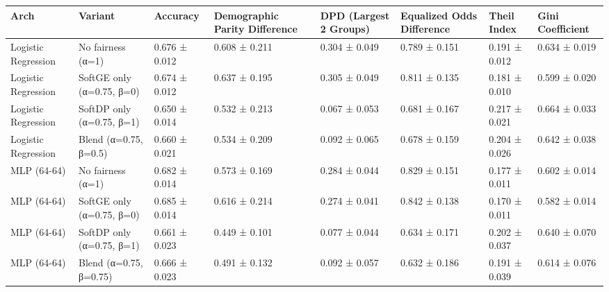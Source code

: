 \begin{tabular}{llllllll}
\toprule
Arch & Variant & Accuracy & Demographic Parity Difference & DPD (Largest 2 Groups) & Equalized Odds Difference & Theil Index & Gini Coefficient \\
\midrule
Logistic Regression & No fairness (α=1) & 0.676 ± 0.012 & 0.608 ± 0.211 & 0.304 ± 0.049 & 0.789 ± 0.151 & 0.191 ± 0.012 & 0.634 ± 0.019 \\
Logistic Regression & SoftGE only (α=0.75, β=0) & 0.674 ± 0.012 & 0.637 ± 0.195 & 0.305 ± 0.049 & 0.811 ± 0.135 & 0.181 ± 0.010 & 0.599 ± 0.020 \\
Logistic Regression & SoftDP only (α=0.75, β=1) & 0.650 ± 0.014 & 0.532 ± 0.213 & 0.067 ± 0.053 & 0.681 ± 0.167 & 0.217 ± 0.021 & 0.664 ± 0.033 \\
Logistic Regression & Blend (α=0.75, β=0.5) & 0.660 ± 0.021 & 0.534 ± 0.209 & 0.092 ± 0.065 & 0.678 ± 0.159 & 0.204 ± 0.026 & 0.642 ± 0.038 \\
MLP (64-64) & No fairness (α=1) & 0.682 ± 0.014 & 0.573 ± 0.169 & 0.284 ± 0.044 & 0.829 ± 0.151 & 0.177 ± 0.011 & 0.602 ± 0.014 \\
MLP (64-64) & SoftGE only (α=0.75, β=0) & 0.685 ± 0.014 & 0.616 ± 0.214 & 0.274 ± 0.041 & 0.842 ± 0.138 & 0.170 ± 0.011 & 0.582 ± 0.014 \\
MLP (64-64) & SoftDP only (α=0.75, β=1) & 0.661 ± 0.023 & 0.449 ± 0.101 & 0.077 ± 0.044 & 0.634 ± 0.171 & 0.202 ± 0.037 & 0.640 ± 0.070 \\
MLP (64-64) & Blend (α=0.75, β=0.75) & 0.666 ± 0.023 & 0.491 ± 0.132 & 0.092 ± 0.057 & 0.632 ± 0.186 & 0.191 ± 0.039 & 0.614 ± 0.076 \\
\bottomrule
\end{tabular}
